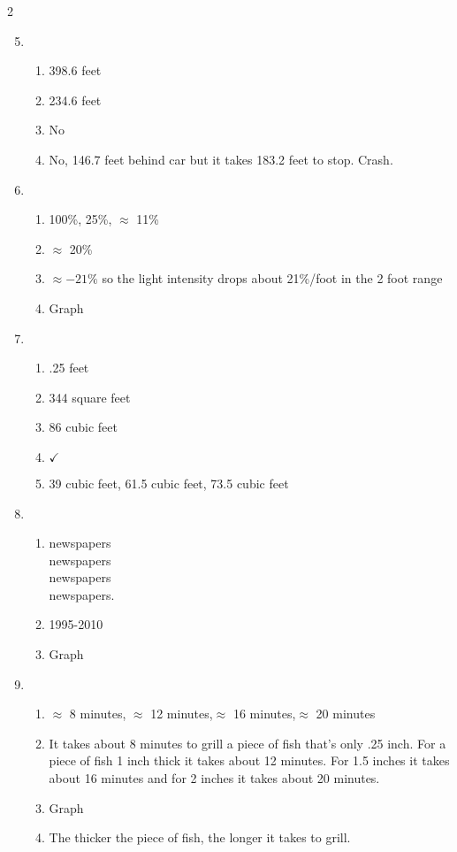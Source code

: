 \begin{multicols} {2}
\begin{enumerate}
\setcounter{enumi}{4}

\item %
\begin{enumerate}
\item 398.6 feet
\item 234.6 feet
\item No
\item No, 146.7 feet behind car but it takes 183.2 feet to stop.  Crash.
\end{enumerate}

\item %
\begin{enumerate}
\item 100\%, 25\%, $\approx$ 11\%
\item $\approx$ 20\%
\item $\approx -21\%$  so the light intensity drops about 21\%/foot  in the 2 foot range
\item Graph
\end{enumerate}

\item %
\begin{enumerate}
\item .25 feet
\item 344 square feet
\item 86 cubic feet
\item $\checkmark$
\item 39 cubic feet, 61.5 cubic feet, 73.5 cubic feet
\end{enumerate}

\item %
\begin{enumerate}
\item {} newspapers \\  newspapers \\  newspapers \\  newspapers.
\item 1995-2010
\item Graph
\end{enumerate}

\item %
\begin{enumerate}
\item $\approx$ 8 minutes, $\approx$ 12 minutes,$\approx$ 16 minutes,$\approx$ 20 minutes
\item It takes about 8 minutes to grill a piece of fish that's only .25 inch.  For a piece of fish 1 inch thick it takes about 12 minutes.  For 1.5 inches it takes about 16 minutes and for 2 inches it takes about 20 minutes.
\item Graph
\item The thicker the piece of fish, the longer it takes to grill.
\end{enumerate}


\end{enumerate}
\end{multicols}
